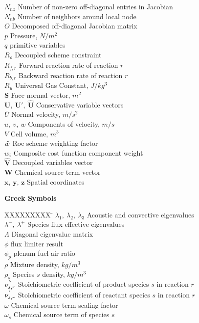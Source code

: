 \begin{tabbing}
  $N_{nz}$ \> Number of non-zero off-diagonal entries in Jacobian \\
  $N_{nb}$ \> Number of neighbors around local node \\
  $O$ \> Decomposed off-diagonal Jacobian matrix \\
  $p$ \> Pressure, $N/m^2$ \\
  $q$ \> primitive variables \\
  $R_\rho$ \> Decoupled scheme constraint \\
  $R_{f,r}$ \> Forward reaction rate of reaction $r$ \\
  $R_{b,r}$ \> Backward reaction rate of reaction $r$ \\
  $R_u$ \> Universal Gas Constant, $J/kg^3$ \\
  $\mathbf{S}$ \> Face normal vector, $m^2$\\
  $\mathbf{U},\ \mathbf{U}',\ \mathbf{\hat{U}}$ \> Conservative variable vectors \\
  $\overline{U}$ \> Normal velocity, $m/s^2$ \\
  $u,\ v,\ w$ \> Components of velocity, $m/s$ \\
  $V$ \> Cell volume, $m^3$ \\
  $\tilde{w}$ \> Roe scheme weighting factor \\
  $w_i$ \> Composite cost function component weight \\
  $\mathbf{\hat{V}}$ \>  Decoupled variables vector \\
  $\mathbf{W}$ \> Chemical source term vector \\
  $\mathbf{x}$, $\mathbf{y}$, $\mathbf{z}$ \> Spatial coordinates \\
 \end{tabbing}

\textbf{Greek Symbols}
\begin{tabbing}
  XXXXXXXXX \= \kill%
  $\lambda_1,\ \lambda_2,\ \lambda_3$ \> Acoustic and convective eigenvalues \\
  $\lambda^-,\ \lambda^+$ \> Species flux effective eigenvalues \\
  $\Lambda$ \> Diagonal eigenvalue matrix \\
  $\phi$ \> flux limiter result \\
  $\phi_p$ \> plenum fuel-air ratio \\
  $\rho$ \> Mixture density, $kg/m^3$ \\
  $\rho_s$ \> Species $s$ density, $kg/m^3$ \\
  $\nu_{s,r}^{''}$ \> Stoichiometric coefficient of product species $s$ in reaction $r$ \\
  $\nu_{s,r}^{'}$ \> Stoichiometric coefficient of reactant species $s$ in reaction $r$ \\
  $\omega$ \> Chemical source term scaling factor \\
  $\omega_s$ \> Chemical source term of species $s$ \\
\end{tabbing}

